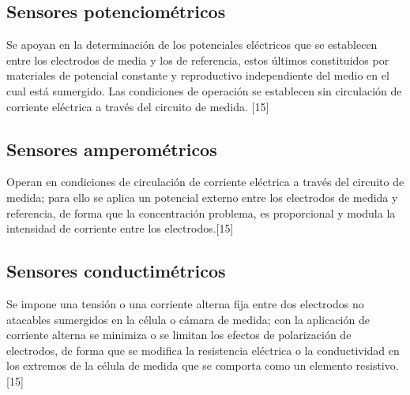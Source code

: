 \subsection{Sensores potenciométricos}
Se apoyan en la determinación de los potenciales eléctricos que se establecen entre los electrodos de media y los de referencia, estos últimos constituidos por materiales de potencial constante y reproductivo independiente del medio en el cual está sumergido. Las condiciones de operación se establecen sin circulación de corriente eléctrica a través del circuito de medida. [15]

\subsection{Sensores amperométricos}
Operan en condiciones de circulación de corriente eléctrica a través del circuito de medida; para ello se aplica un potencial externo entre los electrodos de medida y referencia, de forma que la concentración problema, es proporcional y modula la intensidad de corriente entre los electrodos.[15]

\subsection{Sensores conductimétricos}
Se impone una tensión o una corriente alterna fija entre dos electrodos no atacables sumergidos en la célula o cámara de medida; con la aplicación de corriente alterna se minimiza o se limitan los efectos de polarización de electrodos, de forma que se modifica la resistencia eléctrica o la conductividad en los extremos de la célula de medida que se comporta como un elemento resistivo. [15]

